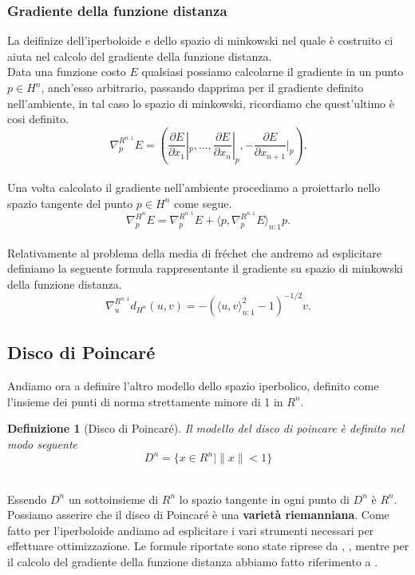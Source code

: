 \documentclass[a4paper, 12pt]{article}
\newtheorem{definition}{Definizione}
\begin{document}
\subsubsection{Gradiente della funzione distanza}
La deifinize dell'iperboloide e dello spazio di minkowski nel quale è costruito ci aiuta nel calcolo del gradiente della funzione distanza.\\
Data una funzione costo $E$ qualsiasi possiamo calcolarne il gradiente in un punto $p \in H^n$, anch'esso arbitrario, passando dapprima per il gradiente definito nell'ambiente, in tal caso lo spazio di minkowski, ricordiamo che quest'ultimo è cosi definito.\\
\[\nabla_{p}^{R^{n:1}} E = (\frac{\partial E}{\partial x_1}|_p, ..., \frac{\partial E}{\partial x_n}|_p, -\frac{\partial E}{\partial x_{n+1}}|_p).\]\\
Una volta calcolato il gradiente nell'ambiente procediamo a proiettarlo nello spazio tangente del punto $p \in H^n$ come segue.\\
\[\nabla_{p}^{H^n} E = \nabla_{p}^{R^{n:1}} E + \langle p, \nabla_{p}^{R^{n:1}} E \rangle_{n:1} p.\]\\
Relativamente al problema della media di fréchet che andremo ad esplicitare definiamo la seguente formula rappresentante il gradiente su spazio di minkowski della funzione distanza.\\
\[\nabla_u^{R^{n:1}} d_{H^n}(u,v) = - (\langle u,v \rangle_{n:1}^2 - 1)^{-1/2} v.\]
\subsection{Disco di Poincaré}
Andiamo ora a definire l'altro modello dello spazio iperbolico, definito come l'insieme dei punti di norma strettamente minore di 1 in $R^n$.
\begin{definition}[Disco di Poincaré]
Il modello del disco di poincare è definito nel modo seguente\\
\[ D^n = \{x \in R^n | \parallel x \parallel < 1\} \]\\
\end{definition}
Essendo $D^n$ un sottoinsieme di $R^n$ lo spazio tangente in ogni punto di $D^n$ è $R^n$. Possiamo asserire che il disco di Poincaré è una \textbf{varietà riemanniana}. Come fatto per l'iperboloide andiamo ad esplicitare i vari strumenti necessari per effettuare ottimizzazione. Le formule riportate sono state riprese da \cite{GeoOpt}, \cite{Hyperbolic Entailment Cones for Learning Hierarchical Embeddings}, mentre per il calcolo del gradiente della funzione distanza abbiamo fatto riferimento a \cite{Poincare for Learning Hierarchical Representations}.
\end{document}
